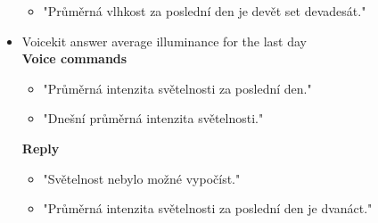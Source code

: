 \begin{itemize}
\begin{itemize}
        \item "Průměrná vlhkost za poslední den je devět set devadesát."
    \end{itemize}
    \item Voicekit answer average illuminance for the last day\\
    \textbf{Voice commands}
    \begin{itemize}
        \item "Průměrná intenzita světelnosti za poslední den."
        \item "Dnešní průměrná intenzita světelnosti."
    \end{itemize}
    \textbf{Reply}
    \begin{itemize}
        \item "Světelnost nebylo možné vypočíst."
        \item "Průměrná intenzita světelnosti za poslední den je dvanáct."
    \end{itemize}





\end{itemize}
